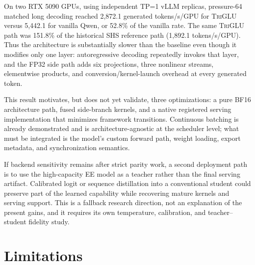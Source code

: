 \documentclass[10pt]{article}
\newcommand{\TriGLU}{\textsc{TriGLU}}
\begin{document}
On two RTX 5090 GPUs, using independent TP=1 vLLM replicas, pressure-64 matched
long decoding reached 2,872.1 generated tokens/s/GPU for \TriGLU{} versus
5,442.1 for vanilla Qwen, or 52.8\% of the vanilla rate.  The same \TriGLU{}
path was 151.8\% of the historical SHS reference path (1,892.1 tokens/s/GPU).
Thus the architecture is substantially slower than the baseline even though it
modifies only one layer: autoregressive decoding repeatedly invokes that layer,
and the FP32 side path adds six projections, three nonlinear streams,
elementwise products, and conversion/kernel-launch overhead at every generated
token.

This result motivates, but does not yet validate, three optimizations: a pure
BF16 architecture path, fused side-branch kernels, and a native registered
serving implementation that minimizes framework transitions.  Continuous
batching is already demonstrated and is architecture-agnostic at the scheduler
level; what must be integrated is the model's custom forward path, weight
loading, export metadata, and synchronization semantics.

If backend sensitivity remains after strict parity work, a second deployment
path is to use the high-capacity EE model as a teacher rather than the final
serving artifact.  Calibrated logit or sequence distillation into a conventional
student could preserve part of the learned capability while recovering mature
kernels and serving support.  This is a fallback research direction, not an
explanation of the present gains, and it requires its own temperature,
calibration, and teacher--student fidelity study.

\section{Limitations}
\end{document}
